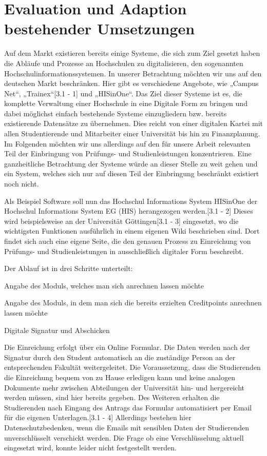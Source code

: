 \section{Evaluation und Adaption bestehender Umsetzungen}

Auf dem Markt existieren bereits einige Systeme, die sich zum Ziel gesetzt haben die Abläufe und Prozesse an Hochschulen zu digitalisieren, den sogenannten Hochschulinformationssystemen. In unserer Betrachtung möchten wir uns auf den deutschen Markt beschränken. Hier gibt es verschiedene Angebote, wie „Campus Net“, „Trainex“[3.1 - 1] und „HISinOne“. Das Ziel dieser Systeme ist es, die komplette Verwaltung einer Hochschule in eine Digitale Form zu bringen und dabei möglichst einfach bestehende Systeme einzugliedern bzw. bereits existierende Datensätze zu übernehmen. Dies reicht von einer digitalen Kartei mit allen Studentierende und Mitarbeiter einer Universität bis hin zu Finanzplanung. Im Folgenden möchten wir uns allerdings auf den für unsere Arbeit relevanten Teil der Einbringung von Prüfungs- und Studienleistungen konzentrieren. Eine ganzheitliche Betrachtung der Systeme würde an dieser Stelle zu weit gehen und ein System, welches sich nur auf diesen Teil der Einbringung beschränkt existiert noch nicht.

Als Beispiel Software soll nun das Hochschul Informations System HISinOne der Hochschul Informations System EG (HIS) herangezogen werden.[3.1 - 2] Dieses wird beispielsweise an der Universität Göttingen[3.1 - 3] eingesetzt, wo die wichtigsten Funktionen ausführlich in einem eigenen Wiki beschrieben sind. Dort findet sich auch eine eigene Seite, die den genauen Prozess zu Einreichung von Prüfungs- und Studienleistungen in ausschließlich digitaler Form beschreibt. 

Der Ablauf ist in drei Schritte unterteilt:

\begin{compactenum}
\item Angabe des Moduls, welches man sich anrechnen lassen möchte
\item Angabe des Moduls, in dem man sich die bereits erzielten Creditpoints anrechnen lassen möchte
\item Digitale Signatur und Abschicken
\end{compactenum}

Die Einreichung erfolgt über ein Online Formular. Die Daten werden nach der Signatur durch den Student automatisch an die zuständige Person an der entsprechenden Fakultät weitergeleitet. Die Voraussetzung, dass die Studierenden die Einreichung bequem von zu Hause erledigen kann und keine analogen Dokumente mehr zwischen Abteilungen der Universität hin- und hergereicht werden müssen, sind hier bereits gegeben. Des Weiteren erhalten die Studierenden nach Eingang des Antrags das Formular automatisiert per Email für die eigenen Unterlagen.[3.1 - 4] Allerdings bestehen hier Datenschutzbedenken, wenn die Emails mit sensiblen Daten der Studierenden unverschlüsselt verschickt werden. Die Frage ob eine Verschlüsselung aktuell eingesetzt wird, konnte leider nicht festgestellt  werden.